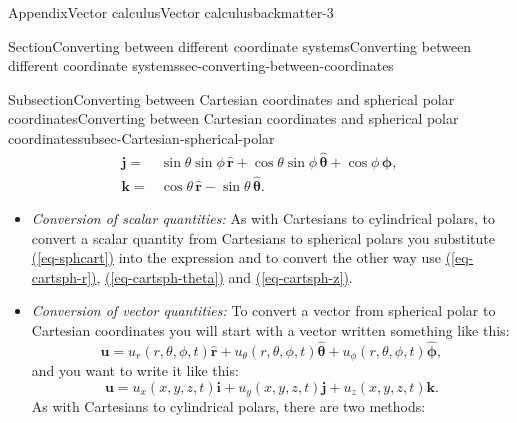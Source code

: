 \documentclass[oneside,10pt,]{book}
\newcommand{\xreffont}{\relax}
\newcommand{\ptxlistdisc}{\raisebox{0.3ex}{\textbullet}}
\newcommand{\ptxlistcircle}{\raisebox{0.3ex}{\textopenbullet}}
\numberwithin{equation}{section}
\newcommand{\bu}{\boldsymbol{u}}
\begin{document}
\begin{appendixptx}{Appendix}{Vector calculus}{}{Vector calculus}{}{}{backmatter-3}
\begin{sectionptx}{Section}{Converting between different coordinate systems}{}{Converting between different coordinate systems}{}{}{sec-converting-between-coordinates}
\begin{subsectionptx}{Subsection}{Converting between Cartesian coordinates and spherical polar coordinates}{}{Converting between Cartesian coordinates and spherical polar coordinates}{}{}{subsec-Cartesian-spherical-polar}
\begin{align}
\boldsymbol{j}=&\sin\theta\sin\phi\,\hat{\boldsymbol{r}}+\cos\theta\sin\phi\,\hat{\boldsymbol{\theta}}+\cos\phi\,\hat{\boldsymbol{\phi}},\label{eq-cartsphpolarunitvectors-j}\\
\boldsymbol{k}=&\cos\theta\,\hat{\boldsymbol{r}}-\sin\theta\,\hat{\boldsymbol{\theta}}.\label{eq-cartsphpolarunitvectors-k}
\end{align}
%
\begin{itemize}[label=\ptxlistdisc]
\item{}\emph{Conversion of scalar quantities:\textbraceright{}} As with Cartesians to cylindrical polars, to convert a scalar quantity from Cartesians to spherical polars you substitute \hyperref[eq-sphcart]{({\xreffont\ref{eq-sphcart}})} into the expression and to convert the other way use \hyperref[eq-cartsph-r]{({\xreffont\ref{eq-cartsph-r}})}, \hyperref[eq-cartsph-theta]{({\xreffont\ref{eq-cartsph-theta}})} and \hyperref[eq-cartsph-z]{({\xreffont\ref{eq-cartsph-z}})}.%
\item{}\emph{Conversion of vector quantities:} To convert a vector from spherical polar to Cartesian coordinates you will start with a vector written something like this:%
\begin{equation}
\bu=u_r(r,\theta,\phi,t)\hat{\boldsymbol{r}}
+u_\theta(r,\theta,\phi,t)\hat{\boldsymbol{\theta}}
+u_\phi(r,\theta,\phi,t)\hat{\boldsymbol{\phi}},\label{eq-usph}
\end{equation}
and you want to write it like this:%
\begin{equation}
\bu=u_x(x,y,z,t)\boldsymbol{i}+u_y(x,y,z,t)\boldsymbol{j}+u_z(x,y,z,t)\boldsymbol{k}.\label{eq-ucart2}
\end{equation}
As with Cartesians to cylindrical polars, there are two methods:%
\begin{itemize}[label=\ptxlistcircle]

\end{itemize}
\end{itemize}
\end{subsectionptx}
\end{sectionptx}
\end{appendixptx}
\end{document}

